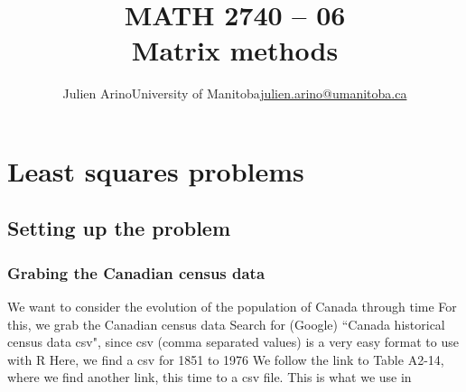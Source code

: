 \documentclass[aspectratio=169]{beamer}\usepackage[]{graphicx}\usepackage[]{xcolor}
\title[Matrix methods]{MATH 2740 -- 06\\ Matrix methods}
\author{\texorpdfstring{Julien Arino\newline University of Manitoba\newline\url{julien.arino@umanitoba.ca}}{Julien Arino}}
\date{}
\begin{document}


\section{Least squares problems}


\subsection{Setting up the problem}

\begin{frame}\frametitle{Grabing the Canadian census data}
We want to consider the evolution of the population of Canada through time
\vfill
For this, we grab the Canadian census data
\vfill Search for (Google) ``Canada historical census data csv", since csv (comma separated values) is a very easy format to use with R
\vfill
Here, we find a csv for 1851 to 1976
\vfill
We follow the link to Table A2-14, where we find another link, this time to a csv file. This is what we use in 
\end{frame}
\end{document}
